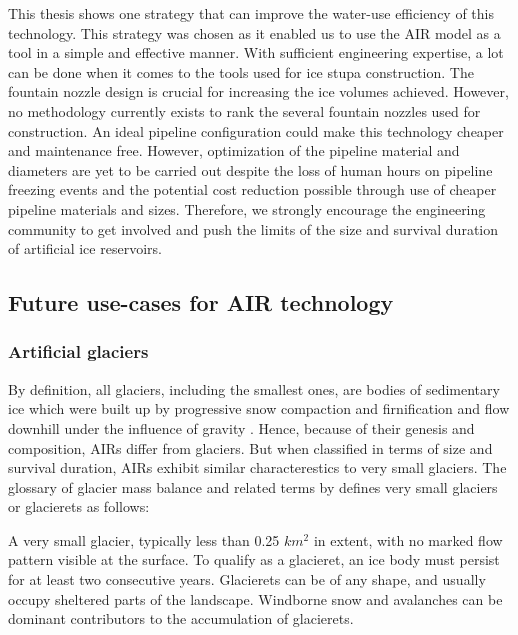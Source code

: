 This thesis shows one strategy that can improve the water-use efficiency of this technology. This strategy was
chosen as it enabled us to use the AIR model as a tool in a simple and effective manner. With sufficient
engineering expertise, a lot can be done when it comes to the tools used for ice stupa construction. The
fountain nozzle design is crucial for increasing the ice volumes achieved. However, no methodology currently
exists to rank the several fountain nozzles used for construction. An ideal pipeline configuration could make
this technology cheaper and maintenance free. However, optimization of the pipeline material and diameters are
yet to be carried out despite the loss of human hours on pipeline freezing events and the potential cost
reduction possible through use of cheaper pipeline materials and sizes. Therefore, we strongly encourage the
engineering community to get involved and push the limits of the size and survival duration of artificial ice
reservoirs. 

\subsection{Future use-cases for AIR technology}

\subsubsection{Artificial glaciers}

By definition, all glaciers, including the smallest ones, are bodies of sedimentary ice which were built up by
progressive snow compaction and firnification and flow downhill under the influence of gravity
\cite{benndouglasiGlaciersGlaciation2014}. Hence, because of their genesis and composition, AIRs differ from
glaciers. But when classified in terms of size and survival duration, AIRs exhibit similar characterestics to
very small glaciers. The glossary of glacier mass balance and related terms by
\citet{cogleyGlossaryGlacierMass2010} defines very small glaciers or glacierets as follows:

\begin{thesis_quotation}
  A very small glacier, typically less than 0.25 $km^2$ in extent, with no marked flow pattern
  visible at the surface. To qualify as a glacieret, an ice body must persist for at least two consecutive
  years. Glacierets can be of any shape, and usually occupy sheltered parts of the landscape. Windborne snow and
  avalanches can be dominant contributors to the accumulation of glacierets. 
\end{thesis_quotation}

